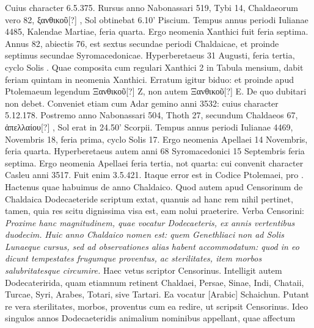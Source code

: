 Cuius character 6.5.375.
Rursus anno Nabonassari
519, Tybi 14, Chaldaeorum vero 82,
 \textgreek{ξανθικοῦ[?] }, Sol obtinebat
6.10' Piscium.
Tempus annus periodi Iulianae %
 4485, Kalendae
Martiae, %
 feria quarta.
Ergo neomenia Xanthici fuit feria septima.
Annus
82, abiectis 76, est sextus secundae periodi Chaldaicae, et proinde
septimus secundae Syromacedonicae.
Hyperberetaeus 31 Augusti, feria
tertia, cyclo Solis .
Quae composita cum regulari Xanthici 2 in
Tabula mensium, dabit feriam quintam in neomenia Xanthici.
Erratum
igitur biduo: et proinde apud Ptolemaeum legendum \textgreek{Ξανθικοῦ[?]} Z,
non autem \textgreek{Ξανθικοῦ[?]} E.
De quo dubitari non debet.
Conveniet etiam
cum Adar gemino anni 3532: cuius character 5.12.178.
Postremo anno
Nabonassari 504, Thoth 27, secundum Chaldaeos 67, \textgreek{ἀπελλαίου[?]
 }, Sol erat in 24.50' Scorpii.
Tempus annus periodi Iulianae 4469,
Novembris 18, feria prima, cyclo Solis 17.
Ergo neomenia Apellaei 14
Novembris, feria quarta.
Hyperberetaeus autem anni 68 Syromacedonici
15 Septembris feria septima.
Ergo neomenia Apellaei feria tertia,
not quarta: cui convenit character Casleu anni 3517.
Fuit enim 3.5.421.
Itaque error est in Codice Ptolemaei,
 \textgreek{} pro \textgreek{}.
Hactenus quae habuimus
de anno Chaldaico.
Quod autem apud Censorinum de Chaldaica
Dodecaeteride scriptum extat, quanuis ad hanc rem nihil pertinet,
tamen, quia res scitu dignissima visa est, eam nolui praeterire.
Verba Censorini:
\emph{Proxime hanc magnitudinem, quae vocatur Dodecaeteris,
ex annis vertentibus duodecim.}
\emph{Huic anno Chaldaico nomen est: quem
Genethliaci non ad Solis Lunaeque cursus, sed ad observationes alias habent 
accommodatum: quod in eo dicunt tempestates frugumque proventus,
ac sterilitates, item morbos salubritatesque circumire.}
Haec %
 vetus scriptor
Censorinus.
Intelligit autem Dodecateririda, quam etiamnum retinent
Chaldaei, Persae, Sinae, %
 Indi, Chataii, Turcae, Syri, Arabes, Totari,
sive Tartari.
Ea vocatur \textarabic{[Arabic]} Schaichun.
Putant re vera sterilitates,
morbos, proventus cum ea redire, ut scripsit Censorinus. %
Ideo singulos
annos Dodecaeteridis animalium nominibus appellant, quae affectum
